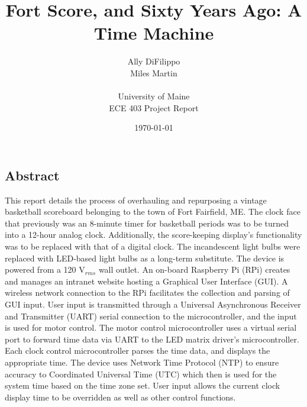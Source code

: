 \documentclass[11pt]{article}
\begin{document}
\title{ \textbf{Fort Score, and Sixty Years Ago: A Time Machine}}
\author{Ally DiFilippo \\
Miles Martin\\ \\
University of Maine \\
ECE 403 Project Report}
\date{\today}
\maketitle
\thispagestyle{empty}




\newpage


\begin{center}
\section*{Abstract}
\end{center}
\noindent
This report details the process of overhauling and repurposing a vintage basketball scoreboard belonging to the town of Fort Fairfield, ME. 
The clock face that previously was an 8-minute timer for basketball periods was to be turned into a 12-hour analog clock. 
Additionally, the score-keeping display's functionality was to be replaced with that of a digital clock.
The incandescent light bulbs were replaced with LED-based light bulbs as a long-term substitute. The device is powered from a 120 V$_{rms}$ wall outlet. 
An on-board Raspberry Pi (RPi) creates and manages an intranet website hosting a Graphical User Interface (GUI). 
A wireless network connection to the RPi facilitates the collection and parsing of GUI input. 
User input is transmitted through a Universal Asynchronous Receiver and Transmitter (UART) serial connection to the microcontroller, and the input is used for motor control.
The motor control microcontroller uses a virtual serial port to forward time data via UART to the LED matrix driver's microcontroller.
Each clock control microcontroller parses the time data, and displays the appropriate time. The device uses Network Time Protocol (NTP) to ensure accuracy to  Coordinated Universal Time (UTC) which then is used for the system time based on the time zone set. 
User input allows the current clock display time to be overridden as well as other control functions. 
\end{document}
